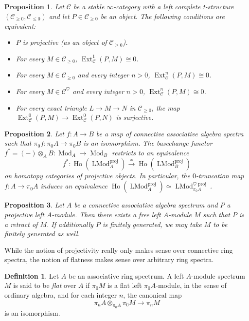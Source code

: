 \documentclass[12pt]{article}
\newtheorem{proposition}{Proposition}[subsection]
\theoremstyle{definition}
\newtheorem{definition}{Definition}[subsection]
\newcommand{\C}{\mathcal{C}}
\renewcommand{\i}{\infty}
\newcommand{\too}{\longrightarrow}
\DeclareMathOperator{\LMod}{LMod}
\DeclareMathOperator{\Mod}{Mod}
\DeclareMathOperator{\Ext}{Ext}
\DeclareMathOperator{\Ho}{Ho}
\DeclareMathOperator{\proj}{proj}
\begin{document}
\begin{proposition}{\em \cite[Proposition 7.2.2.6]{HA}}
Let $\C$ be a stable $\i$-category with a left complete t-structure $(\C_{\geq 0},\C_{\leq 0})$ and let $P\in\C_{\geq 0}$ be an object.
The following conditions are equivalent:
\begin{itemize}\itemsep.1em
\item[\em{(1)}]
$P$ is projective (as an object of $\C_{\geq 0}$).
\item[\em{(2)}]
For every $M\in\C_{\geq 0}$, $\Ext^1_{\C}(P,M)\cong 0$.
\item[\em{(3)}]
For every $M\in\C_{\geq 0}$ and every integer $n > 0$, $\Ext^n_{\C}(P,M)\cong 0$.
\item[\em{(4)}]
For every $M\in\C^\heartsuit$ and every integer $n>0$,  $\Ext^n_{\C}(P,M)\cong 0$.
\item[\em{(5)}]
For every exact triangle $L\to M\to N$ in $\C_{\geq 0}$, the map $\Ext^0_\C(P,M)\to\Ext^0_\C(P,N)$ is surjective.
\end{itemize}
\end{proposition}
\begin{proposition}{\em \cite[Corollary 7.2.2.19]{HA}}\label{prop:projectives}
Let $f:A\to B$ be a map of connective associative algebra spectra such that $\pi_0 f:\pi_0 A\to\pi_0 B$ is an isomorphism.
The basechange functor $f^*=(-)\otimes_A B:\Mod_A\to\Mod_B$ restricts to an equivalence
\[
f^*:\Ho(\LMod_A^{\proj})\overset{\simeq}{\too}\Ho(\LMod_B^{\proj})
\]
on homotopy categories of projective objects.
In particular, the $0$-truncation map $f:A\to\pi_0 A$ induces an equivalence $\Ho(\LMod_A^{\proj})\simeq\LMod_{\pi_0 A}^{\heartsuit\proj}$.
\end{proposition}


\begin{proposition}{\em \cite[Proposition 7.2.2.7]{HA}}
Let $A$ be a connective associative algebra spectrum and $P$ a  projective left $A$-module.
Then there exists a free  left $A$-module $M$ such that $P$ is a retract of $M$.
If additionally $P$ is finitely generated, we may take $M$ to be finitely generated as well.
\end{proposition}
While the notion of projectivity really only makes sense over connective ring spectra, the notion of flatness makes sense over arbitrary ring spectra.

\begin{definition}
Let $A$ be an associative ring spectrum.
A left $A$-module spectrum $M$ is said to be {\em flat} over $A$ if $\pi_0 M$ is a flat left $\pi_0 A$-module, in the sense of ordinary algebra, and for each integer $n$, the canonical map
\[
\pi_n A\otimes_{\pi_0 A}\pi_0 M\too\pi_n M
\]
is an isomorphism.
\end{definition}
\end{document}
